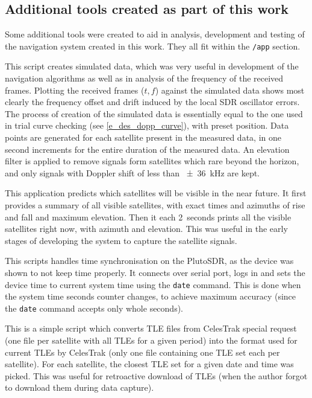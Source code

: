 \subsection{Additional tools created as part of this work}
Some additional tools were created to aid in analysis, development and testing of the navigation system created in this work. They all fit within the \texttt{/app} section.

 This script creates simulated data, which was very useful in development of the navigation algorithms as well as in analysis of the frequency of the received frames. Plotting the received frames ($t, f$) against the simulated data shows most clearly the frequency offset and drift induced by the local SDR oscillator errors. The process of creation of the simulated data is essentially equal to the one used in trial curve checking (see \autoref{e_des_dopp_curve}), with preset position. Data points are generated for each satellite present in the measured data, in one second increments for the entire duration of the measured data. An elevation filter is applied to remove signals form satellites which rare beyond the horizon, and only signals with Doppler shift of less than \qty{\pm36}{kHz} are kept.

 This application predicts which satellites will be visible in the near future. It first provides a summary of all visible satellites, with exact times and azimuths of rise and fall and maximum elevation. Then it each \qty{2}{seconds} prints all the visible satellites right now, with azimuth and elevation. This was useful in the early stages of developing the system to capture the satellite signals.

 This scripts handles time synchronisation on the PlutoSDR, as the device was shown to not keep time properly. It connects over serial port, logs in and sets the device time to current system time using the \texttt{date} command. This is done when the system time seconds counter changes, to achieve maximum accuracy (since the \texttt{date} command accepts only whole seconds).

 This is a simple script which converts TLE files from CelesTrak special request (one file per satellite with all TLEs for a given period) into the format used for current TLEs by CelesTrak (only one file containing one TLE set each per satellite). For each satellite, the closest TLE set for a given date and time was picked. This was useful for retroactive download of TLEs (when the author forgot to download them during data capture).

